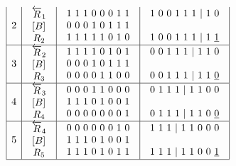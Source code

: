 $$\begin{array}{c}
\begin{array}{|c|c|c|c|}
2 & \begin{array}{c}\overleftarrow{R}_1 \\  \left[B\right]_{\textup{}} \\ R_2\end{array} & \begin{array}{c}1\ 1\ 1\ 0\ 0\ 0\ 1\ 1 \\ 0\ 0\ 0\ 1\ 0\ 1\ 1\ 1 \\ 1\ 1\ 1\ 1\ 1\ 0\ 1\ 0\end{array} & \begin{array}{c}1\ 0\ 0\ 1\ 1\ 1\ |\ 1\ 0 \\  \\ 1\ 0\ 0\ 1\ 1\ 1\ |\ 1\ \underline{1}\end{array} \\ \hline 
3 & \begin{array}{c}\overleftarrow{R}_2 \\  \left[B\right]_{\textup{}} \\ R_3\end{array} & \begin{array}{c}1\ 1\ 1\ 1\ 0\ 1\ 0\ 1 \\ 0\ 0\ 0\ 1\ 0\ 1\ 1\ 1 \\ 0\ 0\ 0\ 0\ 1\ 1\ 0\ 0\end{array} & \begin{array}{c}0\ 0\ 1\ 1\ 1\ |\ 1\ 1\ 0 \\  \\ 0\ 0\ 1\ 1\ 1\ |\ 1\ 1\ \underline{0}\end{array} \\ \hline 
4 & \begin{array}{c}\overleftarrow{R}_3 \\  \left[B\right]_{\textup{}} \\ R_4\end{array} & \begin{array}{c}0\ 0\ 0\ 1\ 1\ 0\ 0\ 0 \\ 1\ 1\ 1\ 0\ 1\ 0\ 0\ 1 \\ 0\ 0\ 0\ 0\ 0\ 0\ 0\ 1\end{array} & \begin{array}{c}0\ 1\ 1\ 1\ |\ 1\ 1\ 0\ 0 \\  \\ 0\ 1\ 1\ 1\ |\ 1\ 1\ 0\ \underline{0}\end{array} \\ \hline 
5 & \begin{array}{c}\overleftarrow{R}_4 \\  \left[B\right]_{\textup{}} \\ R_5\end{array} & \begin{array}{c}0\ 0\ 0\ 0\ 0\ 0\ 1\ 0 \\ 1\ 1\ 1\ 0\ 1\ 0\ 0\ 1 \\ 1\ 1\ 1\ 0\ 1\ 0\ 1\ 1\end{array} & \begin{array}{c}1\ 1\ 1\ |\ 1\ 1\ 0\ 0\ 0 \\  \\ 1\ 1\ 1\ |\ 1\ 1\ 0\ 0\ \underline{1}\end{array} \\ \hline 

\end{array}
\end{array}$$
